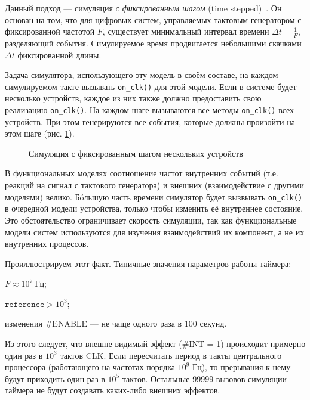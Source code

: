 Данный подход — симуляция \textit{с фиксированным шагом} (\abbr time stepped)~\cite{ferscha-1995-pdes}. Он основан на том, что для цифровых систем, управляемых тактовым генератором с фиксированной частотой $F$, существует минимальный интервал времени $\Delta t = \frac{1}{F}$, разделяющий события. Симулируемое время продвигается небольшими скачками $\Delta t$ фиксированной длины.

Задача симулятора, использующего эту модель в своём составе, на каждом симулируемом такте вызывать \texttt{on_clk()} для этой модели. Если в системе будет несколько устройств, каждое из них также должно предоставить свою реализацию \texttt{on_clk()}. На каждом шаге вызываются все методы \texttt{on_clk()} всех устройств. При этом генерируются все события, которые должны произойти на этом шаге (рис. \ref{fig:time-stepped-sim}).

\begin{figure}[htp]
    \centering
    \caption[Симуляция с фиксированным шагом]{Симуляция с фиксированным шагом нескольких устройств}
    \label{fig:time-stepped-sim}
\end{figure}

В функциональных моделях соотношение частот внутренних событий (т.е. реакций на сигнал с тактового генератора) и внешних (взаимодействие с другими моделями) велико. Бóльшую часть времени симулятор будет вызвывать \texttt{on_clk()} в очередной модели устройства, только чтобы изменить её внутреннее состояние. Это обстоятельство ограничивает скорость симуляции, так как функциональные модели систем используются для изучения взаимодействий их компонент, а не их внутренних процессов.

Проиллюстрируем этот факт. Типичные значения параметров работы таймера:

\begin{itemize*}
    \item $F \approx 10^7\ \text{Гц}$;
    \item $\mathtt{reference} > 10^3$;
    \item изменения \#ENABLE — не чаще одного раза в 100 секунд.
\end{itemize*}

Из этого следует, что внешне видимый эффект (\#INT = 1) происходит примерно один раз в $10^3$ тактов CLK. Если пересчитать период в такты центрального процессора (работающего на частотах порядка $10^9$ Гц), то прерывания к нему будут приходить один раз в $10^5$ тактов. Остальные 99999 вызовов симуляции таймера не будут создавать каких-либо внешних эффектов.

